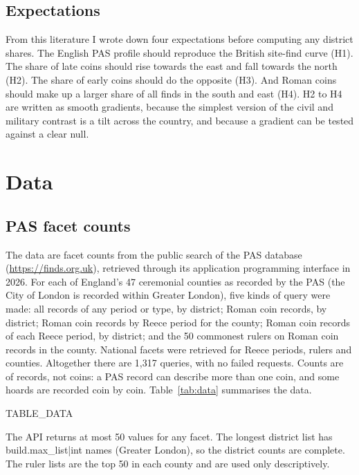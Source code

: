 \documentclass[11pt,a4paper]{article}
\begin{document}
\subsection{Expectations}
From this literature I wrote down four expectations before computing any district shares. The English PAS profile should reproduce the British site-find curve (H1). The share of late coins should rise towards the east and fall towards the north (H2). The share of early coins should do the opposite (H3). And Roman coins should make up a larger share of all finds in the south and east (H4). H2 to H4 are written as smooth gradients, because the simplest version of the civil and military contrast is a tilt across the country, and because a gradient can be tested against a clear null.

\section{Data}\label{sec:data}
\subsection{PAS facet counts}
The data are facet counts from the public search of the PAS database (\url{https://finds.org.uk}), retrieved through its application programming interface in 2026. For each of England's 47 ceremonial counties as recorded by the PAS (the City of London is recorded within Greater London), five kinds of query were made: all records of any period or type, by district; Roman coin records, by district; Roman coin records by Reece period for the county; Roman coin records of each Reece period, by district; and the 50 commonest rulers on Roman coin records in the county. National facets were retrieved for Reece periods, rulers and counties. Altogether there are 1,317 queries, with no failed requests. Counts are of records, not coins: a PAS record can describe more than one coin, and some hoards are recorded coin by coin. Table~\ref{tab:data} summarises the data.

{{TABLE_DATA}}

The API returns at most 50 values for any facet. The longest district list has {{build.max_list|int}} names (Greater London), so the district counts are complete. The ruler lists are the top 50 in each county and are used only descriptively.
\end{document}
